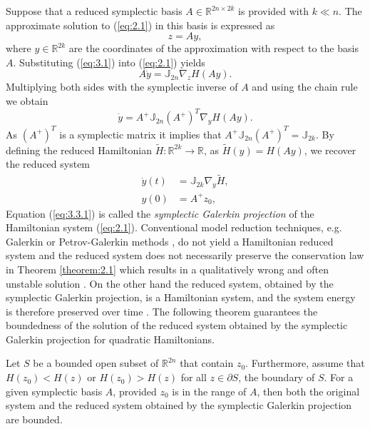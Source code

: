 Suppose that a reduced symplectic basis $A \in \mathbb R^{2n\times 2k}$ is provided with $k \ll n$. The approximate solution to (\ref{eq:2.1}) in this basis is expressed as
\begin{equation} \label{eq:3.1}
	z =Ay,
\end{equation}
where $y\in \mathbb R^{2k}$ are the coordinates of the approximation with respect to the basis $A$. Substituting (\ref{eq:3.1}) into (\ref{eq:2.1}) yields
\begin{equation} \label{eq:3.2}
	A \dot y = \mathbb{J}_{2n} \nabla_{z} H(A y).
\end{equation}
Multiplying both sides with the symplectic inverse of $A$ and using the chain rule we obtain
\begin{equation} \label{eq:3.3}
	\dot y = A^+ \mathbb{J}_{2n} (A^+)^T \nabla_{y} H(A y).
\end{equation}
As $(A^+)^T$ is a symplectic matrix it implies that $A^+ \mathbb{J}_{2n} (A^+)^T = \mathbb{J}_{2k}$. By defining the reduced Hamiltonian $\tilde H : \mathbb{R}^{2k} \to \mathbb R$, as $\tilde H (y) = H(Ay)$, we recover the reduced system
\begin{equation} \label{eq:3.3.1}
	\begin{aligned}
	\dot {y}(t) &= \mathbb J_{2k} \nabla_{y} \tilde H, \\
	y(0) &= A^+ z_0,
	\end{aligned}
\end{equation}
Equation (\ref{eq:3.3.1}) is called the \emph{symplectic Galerkin projection} \cite{Peng:2014di} of the Hamiltonian system (\ref{eq:2.1}). Conventional model reduction techniques, e.g. Galerkin or Petrov-Galerkin methods \cite{hesthaven2015certified,quarteroni2015reduced}, do not yield a Hamiltonian reduced system and the reduced system does not necessarily preserve the conservation law in Theorem \ref{theorem:2.1} which results in a qualitatively wrong and often unstable solution \cite{Peng:2014di}. On the other hand the reduced system, obtained by the symplectic Galerkin projection, is a Hamiltonian system, and the system energy is therefore preserved over time \cite{Peng:2014di}. The following theorem guarantees the boundedness of the solution of the reduced system obtained by the symplectic Galerkin projection for quadratic Hamiltonians.

\begin{theorem}
\cite{Peng:2014di} Let $S$ be a bounded open subset of $\mathbb R^{2n}$ that contain $z_0$. Furthermore, assume that $H(z_0)<H(z)$ or $H(z_0)>H(z)$ for all $z\in \partial S$, the boundary of $S$. For a given symplectic basis $A$, provided $z_0$ is in the range of $A$, then both the original system and the reduced system obtained by the symplectic Galerkin projection are bounded.
\end{theorem}

